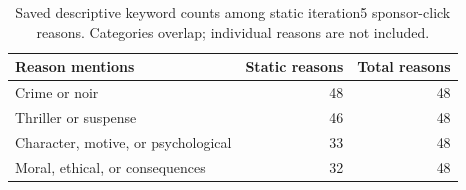 \begin{table}[htbp!]
\centering
\small
\setlength{\tabcolsep}{3pt}
\renewcommand{\arraystretch}{1.1}
\begin{tabular}{lrr}
\hline
Reason mentions & Static reasons & Total reasons \\
\hline
Crime or noir & 48 & 48 \\
Thriller or suspense & 46 & 48 \\
Character, motive, or psychological & 33 & 48 \\
Moral, ethical, or consequences & 32 & 48 \\
\hline
\end{tabular}
\caption{Saved descriptive keyword counts among static iteration5 sponsor-click reasons. Categories overlap; individual reasons are not included.}
\label{chap:results:tab:rq1_seed44_spike_reason_keywords}
\end{table}
